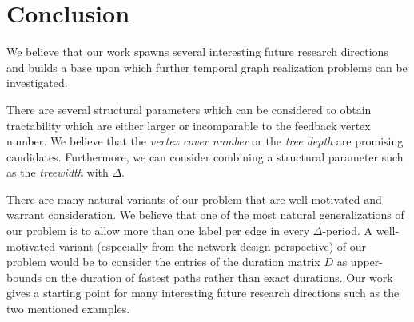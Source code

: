 \documentclass[a4paper,UKenglish,cleveref, autoref, thm-restate, anonymous]{lipics-v2021}
\begin{document}
\section{Conclusion}\label{sec:conclusion}
We believe that our work spawns several interesting future research directions and builds a base upon which further temporal graph realization problems can be investigated.

There are several structural parameters which can be considered to obtain tractability which are either larger or incomparable to the feedback vertex number. We believe that the \emph{vertex cover number} or the \emph{tree depth} are promising candidates.
Furthermore, we can consider combining a structural parameter such as the \emph{treewidth} with $\Delta$.

There are many natural variants of our problem that are well-motivated and warrant consideration. 
We believe that one of the most natural generalizations of our problem is to allow more than one label per edge in every $\Delta$-period. A well-motivated variant (especially from the network design perspective) of our problem would be to consider the entries of the duration matrix $D$ as upper-bounds on the duration of fastest paths rather than exact durations. 
Our work gives a starting point for many interesting future research directions such as the two mentioned examples.



	



\end{document}
